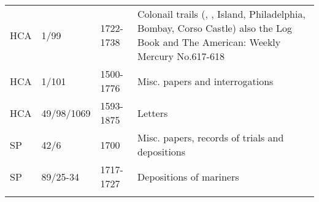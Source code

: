 \begin{sidewaystable}
\begin{tabularx}{\textwidth}{lp{25mm}lQ}
HCA & 1/99 & 1722-1738 & Colonail trails (, ,  Island, Philadelphia, Bombay, Corso Castle) also the Log Book \citet{Pideaux1732} and The American: Weekly Mercury No.617-618\\
HCA & 1/101 & 1500-1776 & Misc. papers and interrogations\\
HCA & 49/98/1069 & 1593-1875 & Letters\\
SP & 42/6 & 1700 & Misc. papers, records of trials and depositions\\
SP & 89/25-34 & 1717-1727 & Depositions of mariners \\
\lspbottomrule
\end{tabularx}
\end{sidewaystable}

